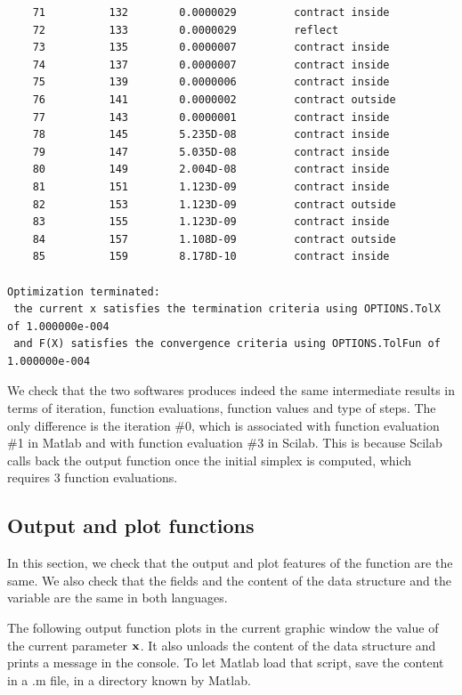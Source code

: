 \begin{lstlisting}
    71          132        0.0000029         contract inside     
    72          133        0.0000029         reflect             
    73          135        0.0000007         contract inside     
    74          137        0.0000007         contract inside     
    75          139        0.0000006         contract inside     
    76          141        0.0000002         contract outside    
    77          143        0.0000001         contract inside     
    78          145        5.235D-08         contract inside     
    79          147        5.035D-08         contract inside     
    80          149        2.004D-08         contract inside     
    81          151        1.123D-09         contract inside     
    82          153        1.123D-09         contract outside    
    83          155        1.123D-09         contract inside     
    84          157        1.108D-09         contract outside    
    85          159        8.178D-10         contract inside     

Optimization terminated:
 the current x satisfies the termination criteria using OPTIONS.TolX of 1.000000e-004
 and F(X) satisfies the convergence criteria using OPTIONS.TolFun of 1.000000e-004
\end{lstlisting}

We check that the two softwares produces indeed the same intermediate results in terms
of iteration, function evaluations, function values and type of steps.
The only difference is the iteration \#0, which is associated with 
function evaluation \#1 in Matlab and with function evaluation \#3 in Scilab.
This is because Scilab calls back the output function once the initial
simplex is computed, which requires 3 function evaluations. 

\subsection{Output and plot functions}

In this section, we check that the output and plot features of the 
 function are the same.
We also check that the fields and the content of the 
data structure and the  variable are the same in 
both languages.

The following output function plots in the current graphic 
window the value of the current parameter $\mathbf{x}$.
It also unloads the content of the 
data structure and prints a message in the console.
To let Matlab load that script, save the content in a 
.m file, in a directory known by Matlab.

